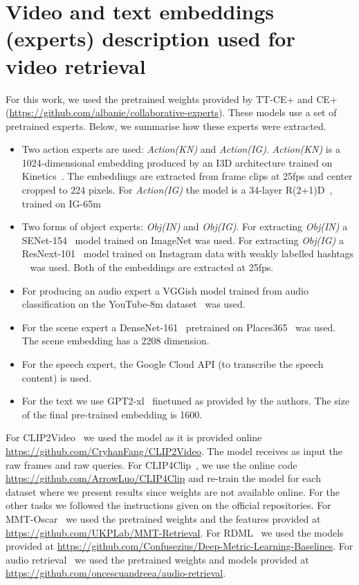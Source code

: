 \section{Video and text embeddings (experts) description used for video retrieval}
\label{sec:experts}
For this work, we used the pretrained weights provided by TT-CE+ \cite{croitoru2021teachtext} and CE+ \cite{liu2019use} (\url{https://github.com/albanie/collaborative-experts}). These models use a set of pretrained experts. Below, we summarise how these experts were extracted.
\begin{itemize}
    \item Two action experts are used: \textit{Action(KN)} and \textit{Action(IG)}. \textit{Action(KN)} is a 1024-dimensional embedding produced by an I3D architecture trained on Kinetics~\cite{carreira2017quo}. The embeddings are extracted from frame clips at 25fps and center cropped to 224 pixels. For \textit{Action(IG)} the model is a 34-layer R(2+1)D~\cite{tran2018closer}, trained on IG-65m~\cite{ghadiyaram2019large}
    \item Two forms of object experts: \textit{Obj(IN)} and \textit{Obj(IG)}. For extracting \textit{Obj(IN)} a SENet-154~\cite{hu2019squeeze} model trained on ImageNet was used. For extracting \textit{Obj(IG)} a ResNext-101~\cite{xie2017aggregated} model trained on Instagram data with weakly labelled hashtags ~\cite{mahajan2018exploring} was used. Both of the embeddings are extracted at 25fps. 
    \item For producing an audio expert a VGGish model trained from audio classification on the YouTube-8m dataset~\cite{hershey2017} was used.
    \item For the scene expert a DenseNet-161~\cite{huang2017densely} pretrained on Places365~\cite{zhou2017places} was used. The scene embedding has a 2208 dimension.
    \item For the speech expert, the Google Cloud API (to transcribe the speech content) is used.
    \item For the text we use GPT2-xl~\cite{radford2019language} finetuned as provided by the authors. The size of the final pre-trained embedding is 1600.
\end{itemize}

For CLIP2Video~\cite{fang2021clip2video} we used the model as it is provided online \url{https://github.com/CryhanFang/CLIP2Video}. The model receives as input the raw frames and raw queries. For CLIP4Clip~\cite{luo2021clip4clip}, we use the online code \url{https://github.com/ArrowLuo/CLIP4Clip} and re-train the model for each dataset where we present results since weights are not available online.
For the other tasks we followed the instructions given on the official repositories. For MMT-Oscar~\cite{geigle2021retrieve} we used the pretrained weights and the features provided at \url{https://github.com/UKPLab/MMT-Retrieval}. For RDML~\cite{roth2020revisiting} we used the models provided at \url{https://github.com/Confusezius/Deep-Metric-Learning-Baselines}. For audio retrieval~\cite{oncescu2021audio} we used the pretrained weights and models provided at \url{https://github.com/oncescuandreea/audio-retrieval}.

